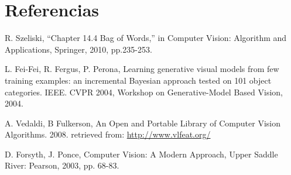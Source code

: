 \documentclass[10pt,twocolumn,letterpaper]{article}
\begin{document}
 

\section{\textbf{Referencias}}
\begin{enumerate}[label={[\arabic*]}]
\item R. Szeliski, “Chapter 14.4 Bag of Words,” in Computer Vision: Algorithm and Applications, Springer, 2010, pp.235-253.\\
\item L. Fei-Fei, R. Fergus, P. Perona, Learning generative visual models from few training examples: an incremental Bayesian approach tested on 101 object categories. IEEE. CVPR 2004, Workshop on Generative-Model Based Vision, 2004.
\item A. Vedaldi, B Fulkerson, An Open and Portable Library of Computer Vision Algorithms. 2008. retrieved from: \url{http://www.vlfeat.org/}
\item D. Forsyth, J. Ponce, Computer Vision: A Modern Approach, Upper Saddle River: Pearson, 2003, pp. 68-83.\\




\end{enumerate}
\end{document}
